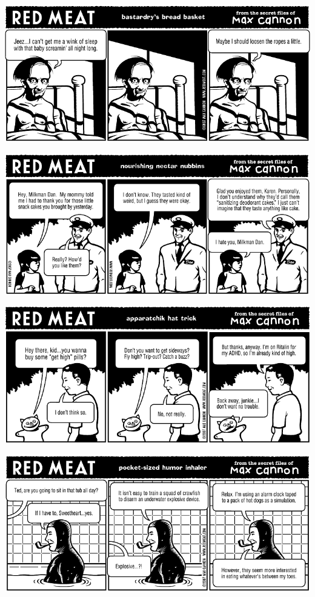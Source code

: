 \documentclass[a4paper,twoside,11pt]{article}
\begin{document}
\includegraphics[width=\textwidth]{redmeat_2007-01-16.png}



\includegraphics[width=\textwidth]{redmeat_2007-01-23.png}



\includegraphics[width=\textwidth]{redmeat_2007-01-30.png}



\includegraphics[width=\textwidth]{redmeat_2007-02-06.png}
\end{document}
